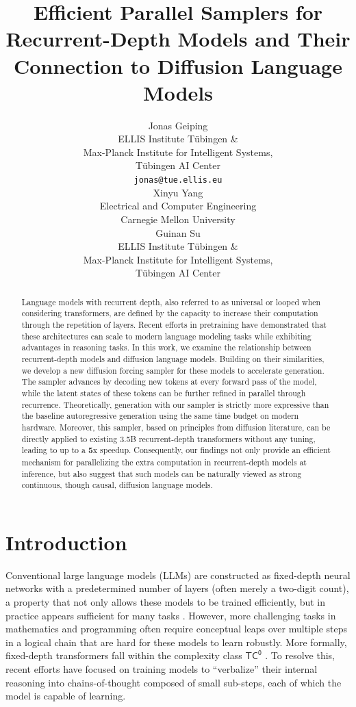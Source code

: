 \documentclass{article} %
\title{Efficient Parallel Samplers for Recurrent-Depth Models and Their Connection to Diffusion Language Models}
\author{Jonas Geiping %
\\
ELLIS Institute Tübingen \& \\ Max-Planck Institute for Intelligent Systems,\\
Tübingen AI Center\\
\texttt{jonas@tue.ellis.eu} \\
\And
Xinyu Yang \\
Electrical and Computer Engineering \\
Carnegie Mellon University \\
\AND
Guinan Su \\
ELLIS Institute Tübingen \& \\ Max-Planck Institute for Intelligent Systems,\\
Tübingen AI Center\\
}
\theoremstyle{definition}
\theoremstyle{plain}
\begin{document}
\maketitle

\begin{abstract}
 Language models with recurrent depth, also referred to as universal or looped when considering transformers, are defined by the capacity to increase their computation through the repetition of layers. Recent efforts in pretraining have demonstrated that these architectures can scale to modern language modeling tasks while exhibiting advantages in reasoning tasks. 
  In this work, we examine the relationship between recurrent-depth models and diffusion language models. Building on their similarities, we develop a new diffusion forcing sampler for these models to accelerate generation. The sampler advances by decoding new tokens at every forward pass of the model, while the latent states of these tokens can be further refined in parallel through recurrence. Theoretically, generation with our sampler is strictly more expressive than the baseline autoregressive generation using the same time budget on modern hardware. 
  Moreover, this sampler, based on principles from diffusion literature, can be directly applied to existing 3.5B recurrent-depth transformers without any tuning, leading to up to a \textbf{5}x speedup. Consequently, our findings not only provide an efficient mechanism for parallelizing the extra computation in recurrent-depth models at inference, but also suggest that such models can be naturally viewed as strong continuous, though causal, diffusion language models. 
\end{abstract}



\section{Introduction}
 Conventional large language models (LLMs) are constructed as fixed-depth neural networks with a predetermined number of layers (often merely a two-digit count), a property that not only allows these models to be trained efficiently, but in practice appears sufficient for many tasks \citep{radford_language_2019}. However, more challenging tasks in mathematics and programming often require conceptual leaps over multiple steps in a logical chain that are hard for these models to learn robustly. More formally, fixed-depth transformers fall within the complexity class $\mathsf{TC}^{\mathsf{0}}$ \citep{merrill_parallelism_2023}. To resolve this, recent efforts have focused on training models to ``verbalize'' their internal reasoning into chains-of-thought composed of small sub-steps, each of which the model is capable of learning. 
\end{document}

